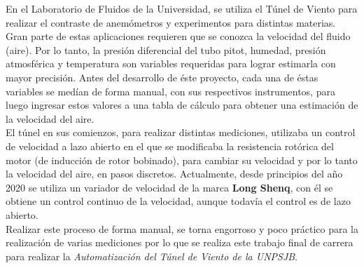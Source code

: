 En el Laboratorio de Fluidos de la Universidad, se utiliza el Túnel de Viento para realizar el contraste de anemómetros y experimentos para distintas materias. Gran parte de estas aplicaciones requieren que se conozca la velocidad del fluido (aire). Por lo tanto, la presión diferencial del tubo pitot, humedad, presión atmosférica y temperatura son variables requeridas para lograr estimarla con mayor precisión.
Antes del desarrollo de éste proyecto, cada una de éstas variables se medían de forma manual, con sus respectivos instrumentos, para luego ingresar estos valores a una tabla de cálculo para obtener una estimación de la velocidad del aire.\\

El túnel en sus comienzos, para realizar distintas mediciones, utilizaba un control de velocidad a lazo abierto en el que se modificaba la resistencia rotórica del motor (de inducción de rotor bobinado), para cambiar su velocidad y por lo tanto la velocidad del aire, en pasos discretos.
Actualmente, desde principios del año 2020 se utiliza un variador de velocidad de la marca \textbf{Long Shenq}, con él se obtiene un control continuo de la velocidad, aunque todavía el control es de lazo abierto. \\

Realizar este proceso de forma manual, se torna engorroso y poco práctico para la realización de varias mediciones por lo que se realiza este trabajo final de carrera para realizar la \textit{Automatización del Túnel de Viento de la UNPSJB}.

\newpage